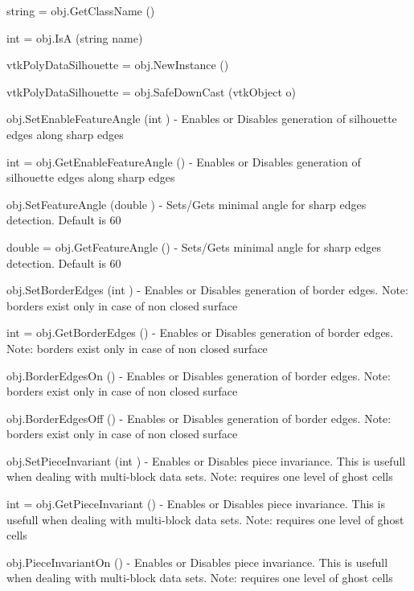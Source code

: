 \begin{DoxyItemize}
\item {\ttfamily string = obj.\-Get\-Class\-Name ()}  
\item {\ttfamily int = obj.\-Is\-A (string name)}  
\item {\ttfamily vtk\-Poly\-Data\-Silhouette = obj.\-New\-Instance ()}  
\item {\ttfamily vtk\-Poly\-Data\-Silhouette = obj.\-Safe\-Down\-Cast (vtk\-Object o)}  
\item {\ttfamily obj.\-Set\-Enable\-Feature\-Angle (int )} -\/ Enables or Disables generation of silhouette edges along sharp edges  
\item {\ttfamily int = obj.\-Get\-Enable\-Feature\-Angle ()} -\/ Enables or Disables generation of silhouette edges along sharp edges  
\item {\ttfamily obj.\-Set\-Feature\-Angle (double )} -\/ Sets/\-Gets minimal angle for sharp edges detection. Default is 60  
\item {\ttfamily double = obj.\-Get\-Feature\-Angle ()} -\/ Sets/\-Gets minimal angle for sharp edges detection. Default is 60  
\item {\ttfamily obj.\-Set\-Border\-Edges (int )} -\/ Enables or Disables generation of border edges. Note\-: borders exist only in case of non closed surface  
\item {\ttfamily int = obj.\-Get\-Border\-Edges ()} -\/ Enables or Disables generation of border edges. Note\-: borders exist only in case of non closed surface  
\item {\ttfamily obj.\-Border\-Edges\-On ()} -\/ Enables or Disables generation of border edges. Note\-: borders exist only in case of non closed surface  
\item {\ttfamily obj.\-Border\-Edges\-Off ()} -\/ Enables or Disables generation of border edges. Note\-: borders exist only in case of non closed surface  
\item {\ttfamily obj.\-Set\-Piece\-Invariant (int )} -\/ Enables or Disables piece invariance. This is usefull when dealing with multi-\/block data sets. Note\-: requires one level of ghost cells  
\item {\ttfamily int = obj.\-Get\-Piece\-Invariant ()} -\/ Enables or Disables piece invariance. This is usefull when dealing with multi-\/block data sets. Note\-: requires one level of ghost cells  
\item {\ttfamily obj.\-Piece\-Invariant\-On ()} -\/ Enables or Disables piece invariance. This is usefull when dealing with multi-\/block data sets. Note\-: requires one level of ghost cells  

\end{DoxyItemize}
